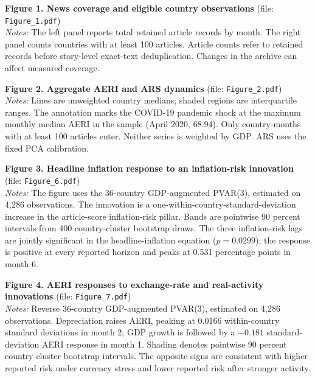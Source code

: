 
\noindent\textbf{Figure 1. News coverage and eligible country observations} (file: \texttt{Figure\_1.pdf})\\
\textit{Notes:} The left panel reports total retained article records by month. The right panel counts countries with at least 100 articles. Article counts refer to retained records before story-level exact-text deduplication. Changes in the archive can affect measured coverage.\par\medskip

\noindent\textbf{Figure 2. Aggregate AERI and ARS dynamics} (file: \texttt{Figure\_2.pdf})\\
\textit{Notes:} Lines are unweighted country medians; shaded regions are interquartile ranges. The annotation marks the COVID-19 pandemic shock at the maximum monthly median AERI in the sample (April 2020, 68.94). Only country-months with at least 100 articles enter. Neither series is weighted by GDP. ARS uses the fixed PCA calibration.\par\medskip

\noindent\textbf{Figure 3. Headline inflation response to an inflation-risk innovation} (file: \texttt{Figure\_6.pdf})\\
\textit{Notes:} The figure uses the 36-country GDP-augmented PVAR(3), estimated on 4,286 observations. The innovation is a one-within-country-standard-deviation increase in the article-score inflation-risk pillar. Bands are pointwise 90 percent intervals from 400 country-cluster bootstrap draws. The three inflation-risk lags are jointly significant in the headline-inflation equation ($p=0.0299$); the response is positive at every reported horizon and peaks at 0.531 percentage points in month 6.\par\medskip

\noindent\textbf{Figure 4. AERI responses to exchange-rate and real-activity innovations} (file: \texttt{Figure\_7.pdf})\\
\textit{Notes:} Reverse 36-country GDP-augmented PVAR(3), estimated on 4,286 observations. Depreciation raises AERI, peaking at 0.0166 within-country standard deviations in month 2; GDP growth is followed by a $-0.181$ standard-deviation AERI response in month 1. Shading denotes pointwise 90 percent country-cluster bootstrap intervals. The opposite signs are consistent with higher reported risk under currency stress and lower reported risk after stronger activity.\par\medskip

